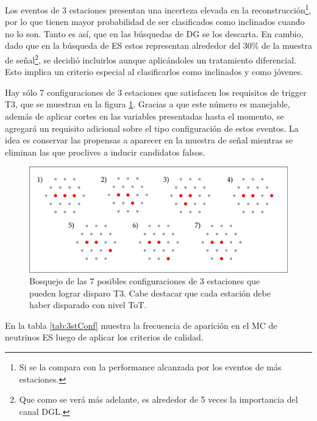 		Los eventos de 3 estaciones presentan una incerteza elevada en la reconstrucción\footnote{Si se la compara con la performance alcanzada por los eventos de más estaciones.}, por lo que tienen mayor probabilidad de ser clasificados como inclinados cuando no lo son.
		Tanto es así, que en las búsquedas de DG se los descarta.
		En cambio, dado que en la búsqueda de ES estos representan alrededor del 30$\%$ de la muestra de señal\footnote{Que como se ver\'a m\'as adelante, es alrededor de 5 veces la importancia del canal DGL.}, se decidi\'o incluirlos aunque aplic\'andoles un tratamiento diferencial.
		Esto implica un criterio especial al clasificarlos como inclinados y como jóvenes.
		
		Hay sólo 7 configuraciones de 3 estaciones que satisfacen los requisitos de trigger T3, que se muestran en la figura \ref{fig:3stConf}.
		Gracias a que este número es manejable, además de aplicar cortes en las variables presentadas hasta el momento, se agregará un requisito adicional sobre el tipo configuración de estos eventos.
		La idea es conservar las propensas a aparecer en la muestra de señal mientras se eliminan las que proclives a inducir candidatos falsos.
		\begin{figure}[ht!]
		\begin{center}
		\includegraphics[width=1.0\textwidth]{fig/seleccionAuger/3stConf}
		\caption{Bosquejo de las 7 posibles configuraciones de 3 estaciones que pueden lograr disparo T3. Cabe destacar que cada estación debe haber disparado con nivel ToT.}
		\label{fig:3stConf}
		\end{center}
		\end{figure}
		En la tabla \ref{tab:3stConf} muestra la frecuencia de aparición en el MC de neutrinos ES luego de aplicar los criterios de calidad.
